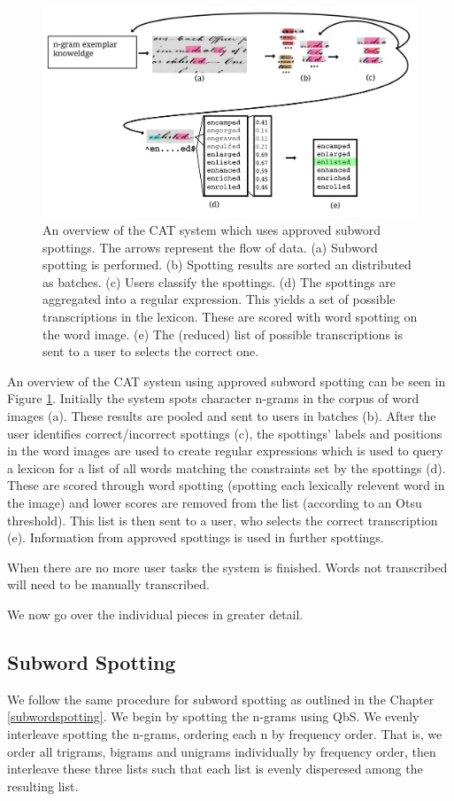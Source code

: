 \documentclass[ms,electronic,twosidetoc,letterpaper,chaptercenter,parttop,lol,lof,lot]{byumsphd}
\begin{document}
\begin{figure}
    \centering
    \includegraphics[width=.9\textwidth]{flow6}
    \caption{An overview of the CAT system which uses approved subword spottings. The arrows represent the flow of data. (a) Subword spotting is performed. (b) Spotting results are sorted an distributed as batches. (c) Users classify the spottings. (d) The spottings are aggregated into a regular expression. This yields a set of possible transcriptions in the lexicon. These are scored with word spotting on the word image. (e) The (reduced) list of possible transcriptions is sent to a user to selects the correct one.}
    \label{fig:flow}
\end{figure}
An overview of the CAT system using approved subword spotting can be seen in Figure \ref{fig:flow}.  Initially the system spots character n-grams in the corpus of word images (a). These results are pooled and sent to users in batches (b). After the user identifies correct/incorrect spottings (c), the spottings' labels and positions in the word images are used to create regular expressions which is used to query a lexicon for a list of all words matching the constraints set by the spottings (d). These are scored through word spotting (spotting each lexically relevent word in the image) and lower scores are removed from the list (according to an Otsu threshold). This list is then sent to a user, who selects the correct transcription (e). Information from approved spottings is used in further spottings.

When there are no more user tasks the system is finished. Words not transcribed will need to be manually transcribed.

We now go over the individual pieces in greater detail.

\subsection{Subword Spotting}
We follow the same procedure for subword spotting as outlined in the Chapter \ref{subwordspotting}. We begin by spotting the n-grams using QbS. We evenly interleave spotting the n-grams, ordering each n by frequency order. That is, we order all trigrams, bigrams and unigrams individually by frequency order, then interleave these three lists such that each list is evenly disperesed among the resulting list. 
\end{document}
